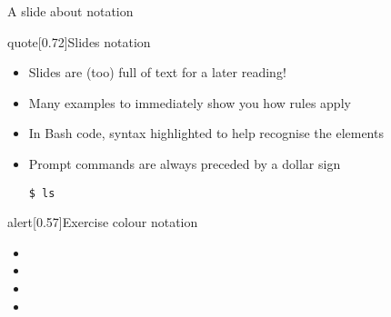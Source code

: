 \begin{frame}[fragile]{A slide about notation}
    \vspace{-5mm}
    \begin{varblock*}{quote}[0.72\textwidth]{Slides notation}
        \normalfont
        \begin{itemize}
            \setlength{\itemindent}{-1mm}
            \item Slides are (too) full of text for a later reading!
            \item Many examples to immediately show you how rules apply
            \item In Bash code, syntax highlighted to help recognise the elements
            \item Prompt commands are always preceded by a dollar sign 
                  \begin{lstlisting}[style=MyBash, numbers=none, aboveskip=2mm, xleftmargin=1mm, xrightmargin=12mm]
                      $ ls
                  \end{lstlisting}
        \end{itemize}
    \end{varblock*}
    \begin{varblock*}{alert}[0.57\textwidth]{Exercise colour notation}
        \begin{itemize}
            \setlength{\itemindent}{-1mm}
            \item {}
            \item {}
            \item {}
            \item {}
        \end{itemize}
    \end{varblock*}
\end{frame}
